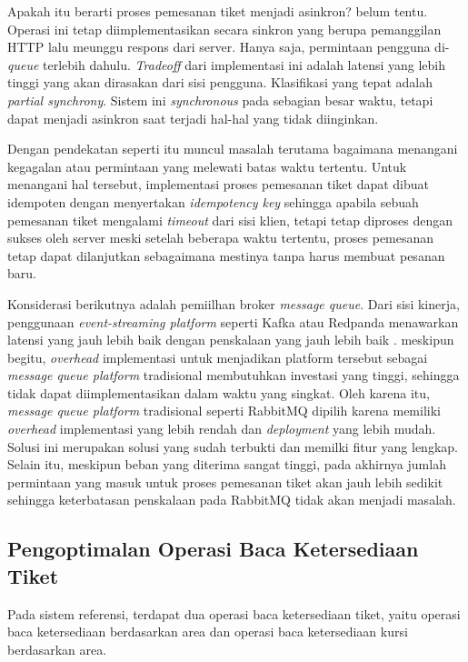 Apakah itu berarti proses pemesanan tiket menjadi asinkron? belum tentu. Operasi ini tetap diimplementasikan secara sinkron yang berupa pemanggilan HTTP lalu meunggu respons dari server. Hanya saja, permintaan pengguna di-\textit{queue} terlebih dahulu. \textit{Tradeoff} dari implementasi ini adalah latensi yang lebih tinggi yang akan dirasakan dari sisi pengguna. Klasifikasi yang tepat adalah \textit{partial synchrony}. Sistem ini \textit{synchronous} pada sebagian besar waktu, tetapi dapat menjadi asinkron saat terjadi hal-hal yang tidak diinginkan.

Dengan pendekatan seperti itu muncul masalah terutama bagaimana menangani kegagalan atau permintaan yang melewati batas waktu tertentu. Untuk menangani hal tersebut, implementasi proses pemesanan tiket dapat dibuat idempoten dengan menyertakan \textit{idempotency key} sehingga apabila sebuah pemesanan tiket mengalami \textit{timeout} dari sisi klien, tetapi tetap diproses dengan sukses oleh server meski setelah beberapa waktu tertentu, proses pemesanan tetap dapat dilanjutkan sebagaimana mestinya tanpa harus membuat pesanan baru.

Konsiderasi berikutnya adalah pemiilhan broker \textit{message queue}. Dari sisi kinerja, penggunaan \textit{event-streaming platform} seperti Kafka atau Redpanda menawarkan latensi yang jauh lebih baik dengan penskalaan yang jauh lebih baik \parencite{comparingKafkaAlternatives}. meskipun begitu, \textit{overhead} implementasi untuk menjadikan platform tersebut sebagai \textit{message queue platform} tradisional membutuhkan investasi yang tinggi, sehingga tidak dapat diimplementasikan dalam waktu yang singkat. Oleh karena itu, \textit{message queue platform} tradisional seperti RabbitMQ dipilih karena memiliki \textit{overhead} implementasi yang lebih rendah dan \textit{deployment} yang lebih mudah. Solusi ini merupakan solusi yang sudah terbukti dan memilki fitur yang lengkap. Selain itu, meskipun beban yang diterima sangat tinggi, pada akhirnya jumlah permintaan yang masuk untuk proses pemesanan tiket akan jauh lebih sedikit sehingga keterbatasan penskalaan pada RabbitMQ tidak akan menjadi masalah.

\subsection{Pengoptimalan Operasi Baca Ketersediaan Tiket}

Pada sistem referensi, terdapat dua operasi baca ketersediaan tiket, yaitu operasi baca ketersediaan berdasarkan area dan operasi baca ketersediaan kursi berdasarkan area.

